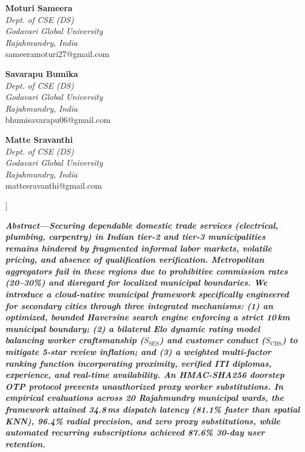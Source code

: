 \documentclass[10pt,twocolumn,a4paper]{article}
\begin{document}
{\begin{center}
    \begin{minipage}[t]{0.31\textwidth}
      \centering
      \textbf{Moturi Sameera}\\
      \textit{Dept. of CSE (DS)}\\
      \textit{Godavari Global University}\\
      \textit{Rajahmundry, India}\\
      sameeramoturi27@gmail.com
    \end{minipage}
    \hfill
    \begin{minipage}[t]{0.31\textwidth}
      \centering
      \textbf{Savarapu Bumika}\\
      \textit{Dept. of CSE (DS)}\\
      \textit{Godavari Global University}\\
      \textit{Rajahmundry, India}\\
      bhumisavarapu06@gmail.com
    \end{minipage}
    \hfill
    \begin{minipage}[t]{0.31\textwidth}
      \centering
      \textbf{Matte Sravanthi}\\
      \textit{Dept. of CSE (DS)}\\
      \textit{Godavari Global University}\\
      \textit{Rajahmundry, India}\\
      mattesravanthi@gmail.com
    \end{minipage}
    \vspace{0.4em}
  \end{center}
}]

\noindent
\textbf{\textit{Abstract---Securing dependable domestic trade services (electrical, plumbing, carpentry) in Indian tier-2 and tier-3 municipalities remains hindered by fragmented informal labor markets, volatile pricing, and absence of qualification verification. Metropolitan aggregators fail in these regions due to prohibitive commission rates (20--30\%) and disregard for localized municipal boundaries. We introduce a cloud-native municipal framework specifically engineered for secondary cities through three integrated mechanisms: (1) an optimized, bounded Haversine search engine enforcing a strict 10\,km municipal boundary; (2) a bilateral Elo dynamic rating model balancing worker craftsmanship ($S_{\text{SES}}$) and customer conduct ($S_{\text{CBS}}$) to mitigate 5-star review inflation; and (3) a weighted multi-factor ranking function incorporating proximity, verified ITI diplomas, experience, and real-time availability. An HMAC-SHA256 doorstep OTP protocol prevents unauthorized proxy worker substitutions. In empirical evaluations across 20 Rajahmundry municipal wards, the framework attained 34.8\,ms dispatch latency (81.1\% faster than spatial KNN), 96.4\% radial precision, and zero proxy substitutions, while automated recurring subscriptions achieved 87.6\% 30-day user retention.}}
\end{document}

